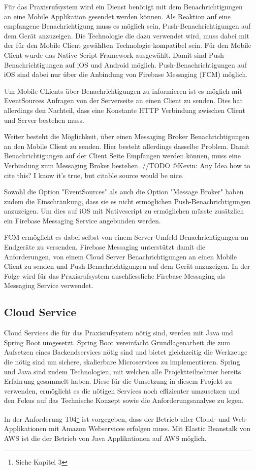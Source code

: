Für das Praxisrufsystem wird ein Dienst benötigt mit dem Benachrichtigungen an eine Mobile Applikation gesendet werden können.
Als Reaktion auf eine empfangene Benachrichtigung muss es möglich sein, Push-Benachrichtigungen auf dem Gerät anzuzeigen.
Die Technologie die dazu verwendet wird, muss dabei mit der für den Mobile Client gewählten Technologie kompatibel sein.
Für den Mobile Client wurde das Native Script Framework ausgewählt.
Damit sind Push-Benachrichtigungen auf iOS und Android möglich.
Push-Benachrichtigungen auf iOS sind dabei nur über die Anbindung von Firebase Messaging (FCM) möglich.\cite{nativescript-push}

Um Mobile CLients über Benachrichtigungen zu informieren ist es möglich mit EventSources\cite{event-source} Anfragen von der Serverseite an einen Client zu senden.
Dies hat allerdings den Nachteil, dass eine Konstante HTTP Verbindung zwischen Client und Server bestehen muss.

Weiter besteht die Möglichkeit, über einen Messaging Broker Benachrichtigungen an den Mobile Client zu senden.
Hier besteht allerdings dasselbe Problem.
Damit Benachrichtigungen auf der Client Seite Empfangen werden können, muss eine Verbindung zum Messaging Broker bestehen. //TODO @Kevin: Any Idea how to cite this? I know it's true, but citable source would be nice.

Sowohl die Option "EventSources" als auch die Option "Message Broker" haben zudem die Einschränkung, dass sie es nicht ermöglichen Push-Benachrichtigungen anzuzeigen.
Um dies auf iOS mit Nativescript zu ermöglichen müsste zusätzlich ein Firebase Messaging Service angebunden werden.

FCM ermöglicht es dabei selbst von einem Server Umfeld Benachrichtigungen an Endgeräte zu versenden.\cite{fcm-java}
Firebase Messaging unterstützt damit die Anforderungen, von einem Cloud Server Benachrichtigungen an einen Mobile Client zu senden und Push-Benachrichtigungen auf dem Gerät anzuzeigen.
In der Folge wird für das Praxisrufsystem auschliessliche Firebase Messaging als Messaging Service verwendet.

\subsection{Cloud Service}\label{subsec:cloud-service2}

Cloud Services die für das Praxisrufsystem nötig sind, werden mit Java und Spring Boot umgesetzt.
Spring Boot vereinfacht Grundlagenarbeit die zum Aufsetzen eines Backendservices nötig sind und bietet
gleichzeitig die Werkzeuge die nötig sind um sichere, skalierbare Microservices zu implementieren.\cite{why-spring}
Spring und Java sind zudem Technologien, mit welchen alle Projektteilnehmer bereits Erfahrung gesammelt haben.
Diese für die Umsetzung in diesem Projekt zu verwenden, ermöglicht es die nötigen Services noch effizienter umzusetzen
und den Fokus auf das Technische Konzept sowie die Anforderungsanalyse zu legen.

In der Anforderung T04\footnote{Siehe Kapitel 3} ist vorgegeben, dass der Betrieb aller Cloud- und Web-Applikationen mit Amazon Webservices erfolgen muss.
Mit Elastic Beanstalk von AWS ist die der Betrieb von Java Applikationen auf AWS möglich.\cite{aws-spring-java}


